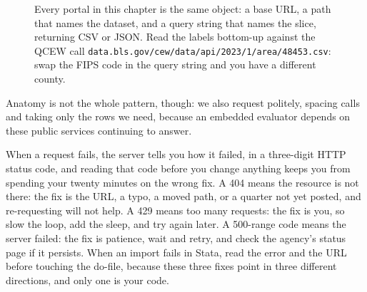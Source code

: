 \documentclass[
    a4paper,
    fontsize=10pt,
    twoside=true,
    numbers=noenddot,
]{kaobook}
\begin{document}
\begin{figure}[htbp]
\centering
{}
\caption[Anatomy of an API request]{Every portal in this chapter is the same object: a base URL, a path that names the dataset, and a query string that names the slice, returning CSV or JSON. Read the labels bottom-up against the QCEW call \texttt{data.bls.gov/cew/data/api/2023/1/area/48453.csv}: swap the FIPS code in the query string and you have a different county.}
\label{fig:ch03-viz-anatomy}
\end{figure}

Anatomy is not the whole pattern, though: we also request politely, spacing calls and taking only the rows we need, because an embedded evaluator depends on these public services continuing to answer.

When a request fails, the server tells you how it failed, in a three-digit HTTP status code, and reading that code before you change anything keeps you from spending your twenty minutes on the wrong fix. A 404 means the resource is not there: the fix is the URL, a typo, a moved path, or a quarter not yet posted, and re-requesting will not help. A 429 means too many requests: the fix is you, so slow the loop, add the sleep, and try again later. A 500-range code means the server failed: the fix is patience, wait and retry, and check the agency's status page if it persists. When an import fails in Stata, read the error and the URL before touching the do-file, because these three fixes point in three different directions, and only one is your code.
\end{document}
